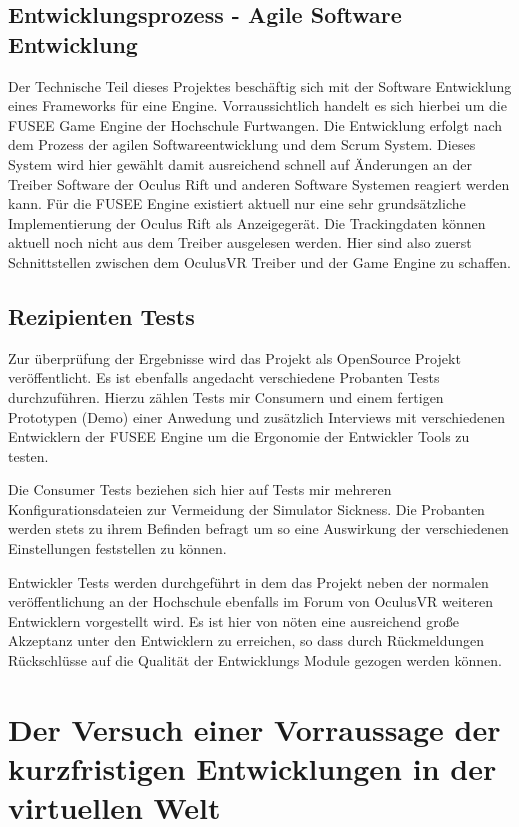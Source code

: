 \documentclass[pagesize, paper=a4, fontsize=12pt,titlepage=true, headings=small, headnosepline, abstractoff, liststotoc, nochapterprefix, plainheadsepline]{scrreprt}
\begin{document}
\section{Entwicklungsprozess - Agile Software Entwicklung}
Der Technische Teil dieses Projektes beschäftig sich mit der Software Entwicklung eines Frameworks für eine Engine. Vorraussichtlich handelt es sich hierbei um die FUSEE Game Engine der Hochschule Furtwangen. Die Entwicklung erfolgt nach dem Prozess der agilen Softwareentwicklung und dem Scrum System. Dieses System wird hier gewählt damit ausreichend schnell auf Änderungen an der Treiber Software der Oculus Rift und anderen Software Systemen reagiert werden kann. Für die FUSEE Engine existiert aktuell nur eine sehr grundsätzliche Implementierung der Oculus Rift als Anzeigegerät. Die Trackingdaten können aktuell noch nicht aus dem Treiber ausgelesen werden. Hier sind also zuerst Schnittstellen zwischen dem OculusVR Treiber und der Game Engine zu schaffen. 

\section{Rezipienten Tests}
Zur überprüfung der Ergebnisse wird das Projekt als OpenSource Projekt veröffentlicht. Es ist ebenfalls angedacht verschiedene Probanten Tests durchzuführen. Hierzu zählen Tests mir Consumern und einem fertigen Prototypen (Demo) einer Anwedung und zusätzlich Interviews mit verschiedenen Entwicklern der FUSEE Engine um die Ergonomie der Entwickler Tools zu testen.

Die Consumer Tests beziehen sich hier auf Tests mir mehreren Konfigurationsdateien zur Vermeidung der Simulator Sickness. Die Probanten werden stets zu ihrem Befinden befragt um so eine Auswirkung der verschiedenen Einstellungen feststellen zu können.

 Entwickler Tests werden durchgeführt in dem das Projekt neben der normalen veröffentlichung an der Hochschule ebenfalls im Forum von OculusVR weiteren Entwicklern vorgestellt wird. Es ist hier von nöten eine ausreichend große Akzeptanz unter den Entwicklern zu erreichen, so dass durch Rückmeldungen Rückschlüsse auf die Qualität der Entwicklungs Module gezogen werden können. 



\chapter{Der Versuch einer Vorraussage der kurzfristigen Entwicklungen in der virtuellen Welt}
\end{document}
